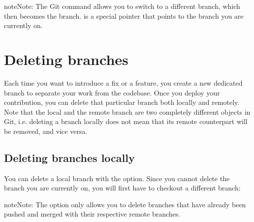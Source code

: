 \documentclass[a4paper,10pt,english,openany,oneside]{sphinxmanual}
\begin{document}
\begin{sphinxadmonition}{note}{Note:}
\sphinxAtStartPar
The Git command  allows you to switch to a different branch, which then becomes the  branch.  is a special pointer that points to the branch you are currently on.
\end{sphinxadmonition}


\section{Deleting branches}
\label{\detokenize{gitinminutes:deleting-branches}}
\sphinxAtStartPar
Each time you want to introduce a fix or a feature, you create a new dedicated branch to separate your work from the codebase. Once you deploy your contribution, you can delete that particular branch both locally and remotely. Note that the local and the remote branch are two completely different objects in Git, i.e. deleting a branch locally does not mean that its remote counterpart will be removed, and vice versa.


\subsection{Deleting branches locally}
\label{\detokenize{gitinminutes:deleting-branches-locally}}
\sphinxAtStartPar
You can delete a local branch with the  option. Since you cannot delete the branch you are currently on, you will first have to checkout a different branch:

\begin{sphinxVerbatim}[commandchars=\\\{\}]
   

   
\end{sphinxVerbatim}

\begin{sphinxadmonition}{note}{Note:}
\sphinxAtStartPar
The  option only allows you to delete branches that have already been pushed and merged with their respective remote branches.
\end{sphinxadmonition}
\end{document}
